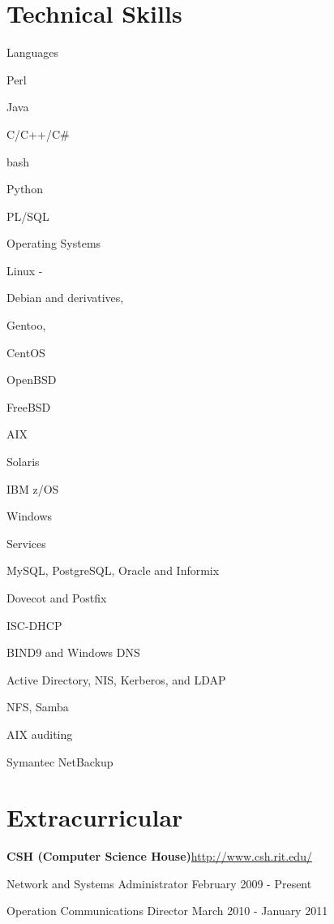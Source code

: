 \documentclass[letter,margin,line]{resume}
\newcommand{\rurl}[1]{\hfill {\footnotesize \url{#1}}}
\begin{document}
\begin{resume}
\section{\mysidestyle Technical Skills}
	\begin{compactdesc}
		\item[Languages] \begin{inparaenum} { \small
			\item Perl
			\item Java
			\item C/C++/C\#
			\item bash
			\item Python
			\item PL/SQL
		} \end{inparaenum}
		\item[Operating Systems] \begin{inparaenum} { \small
			\item Linux -
			\begin{inparablank}
				\item Debian and derivatives,
				\item Gentoo,
				\item CentOS
			\end{inparablank}
			\item OpenBSD
			\item FreeBSD
     			\item AIX
			\item Solaris
			\item IBM z/OS
			\item Windows
		} \end{inparaenum}
		\item[Services] \begin{inparaenum} { \small
			\item MySQL, PostgreSQL, Oracle and Informix
			\item Dovecot and Postfix
			\item ISC-DHCP
			\item BIND9 and Windows DNS
			\item Active Directory, NIS, Kerberos, and LDAP
			\item NFS, Samba
            \item AIX auditing
            \item Symantec NetBackup
		} \end{inparaenum}
	\end{compactdesc}

\section{\mysidestyle Extracurricular}
	\begin{asparablank}
		\item {\bf CSH ({\small Computer Science House})}\rurl{http://www.csh.rit.edu/}
		\small	\item Network and Systems Administrator \hfill February 2009 - Present
				\item Operation Communications Director \hfill March 2010 - January 2011
	\end{asparablank}
	

\end{resume}
\end{document}
